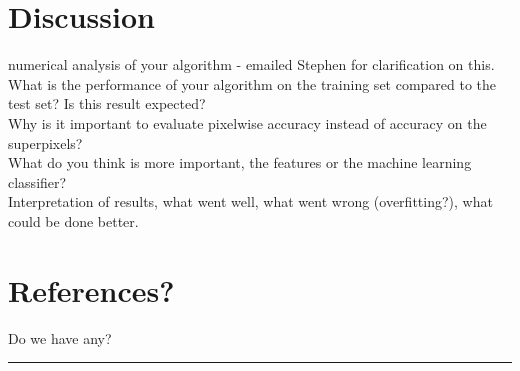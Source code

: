 \documentclass[11pt,a4paper]{article}
\newcommand{\Hrule}{\textcolor{blue}{\rule{\linewidth}{0.5mm}}}
\begin{document}
\begin{multicols}{2}
\section{Discussion}
numerical analysis of your algorithm - emailed Stephen for clarification on this.\\
What is the performance of your algorithm on the training set compared to the test set? Is this result expected?\\
Why is it important to evaluate pixelwise accuracy instead of accuracy on the superpixels?\\
What do you think is more important, the features or the machine learning classifier?\\
Interpretation of results, what went well, what went wrong (overfitting?), what could be done better.

\section{References?}
Do we have any?
\end{multicols}
\vfill\Hrule
\end{document}
